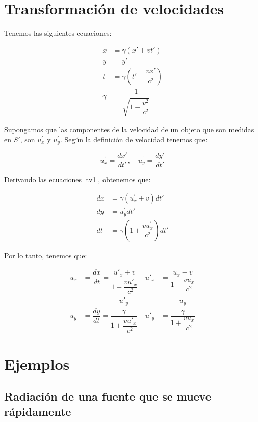 \documentclass[../main]{subfiles}
\begin{document}
\chapter{Transformación de velocidades}

Tenemos las siguientes ecuaciones:

\begin{align}
    x&=\gamma(x'+vt') \nonumber \\
    y&=y' \nonumber \\
    t&=\gamma\left(t'+\dfrac{vx'}{c^2}\right) \nonumber \\
    \gamma&=\dfrac{1}{\sqrt{1-\dfrac{v^2}{c^2}}}
    \label{tv1}
\end{align}

Supongamos que las componentes de la velocidad de un objeto que son medidas en $S'$, son $u_x^{'}$ y $u_y^{'}$. Según la definición de velocidad tenemos que:

\begin{equation}
     u_x^{'}=\dfrac{dx'}{dt'}, \quad u_y^{'}=\dfrac{dy'}{dt'}
     \label{tv2}
\end{equation}

Derivando las ecuaciones \eqref{tv1}, obtenemos que:

\begin{align*}
    dx&=\gamma(u_x^{'}+v)dt' \\
    dy&=u_y^{'}dt' \\
    dt&=\gamma\left( 1+\dfrac{vu_x^{'}}{c^2} \right)dt'
\end{align*}

Por lo tanto, tenemos que:

\begin{align}
    u_x&=\dfrac{dx}{dt}=\dfrac{u'_x+v}{1+\dfrac{vu'_x}{c^2}} &\ u'_x&=\dfrac{u_x-v}{1-\dfrac{vu_x}{c^2}} \\
    u_y&=\dfrac{dy}{dt}=\dfrac{\dfrac{u'_y}{\gamma}}{{1+\dfrac{vu'_x}{c^2}}} &\ u'_y&= \dfrac{\dfrac{u_y}{\gamma}}{{1+\dfrac{vu_x}{c^2}}}
\end{align}

\chapter{Ejemplos}

\section{Radiación de una fuente que se mueve rápidamente}
\end{document}
